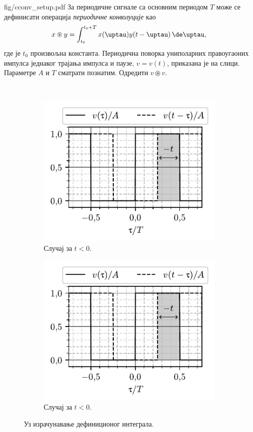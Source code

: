 \begin{slikaDesno}{fig/cconv_setup.pdf}
\PID \label{z:kruz_konv}
За периодичне сигнале са основним 
периодом $T$ може се дефинисати 
операција \textit{периодичне
конволуције} као 
$$x \circledast y = \int_{t_0}^{t_0 + T} 
x(\uptau) y(t-\uptau) \, \de \uptau,$$
где је $t_0$ произвољна константа. Периодична поворка  униполарних
правоугаоних импулса једнаког трајања импулса и паузе,
$v = v(t)$, приказана је на слици. Параметре $A$ и $T$ сматрати познатим.
Одредити $v \circledast v$.
\end{slikaDesno} \\
\vspace*{2mm}

\RESENJE

\begin{figure}[ht!]
    \centering
    \begin{subfigure}[c]{0.49\textwidth}
        \centering
        \includegraphics[page=1]{fig/cconv.pdf}    
        \caption{Случај за $t<0$.}
    \end{subfigure}
    \begin{subfigure}[c]{0.49\textwidth}
        \centering
        \includegraphics[page=2]{fig/cconv.pdf}    
        \caption*{Случај за $t<0$.}
    \end{subfigure}
    \caption{Уз израчунавање дефиниционог интеграла.}
    \label{fig:\ID.int}
\end{figure}

